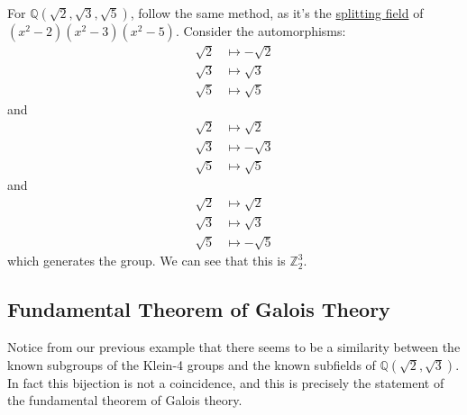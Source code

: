   \begin{example}
    \label{ex:computing-galois-groups-of-3-adjoining-elements}
    For $\mathbb{Q}(\sqrt{2}, \sqrt{3}, \sqrt{5})$, follow the same method, as it's the \hyperref[def:splitting-field]{splitting field} of $(x^2 - 2)(x^2 - 3)(x^2 - 5)$. Consider the automorphisms:
    \begin{align}
      \sqrt{2} &\mapsto -\sqrt{2} \\
      \sqrt{3} &\mapsto \sqrt{3} \\
      \sqrt{5} &\mapsto \sqrt{5}
    \end{align}
    and
    \begin{align}
      \sqrt{2} &\mapsto \sqrt{2} \\
      \sqrt{3} &\mapsto -\sqrt{3} \\
      \sqrt{5} &\mapsto \sqrt{5}
    \end{align}
    and
    \begin{align}
      \sqrt{2} &\mapsto \sqrt{2} \\
      \sqrt{3} &\mapsto \sqrt{3} \\
      \sqrt{5} &\mapsto -\sqrt{5}
    \end{align}
    which generates the group. We can see that this is $\mathbb{Z}_2^3$. 
  \end{example}

\subsection{Fundamental Theorem of Galois Theory}

  Notice from our previous example that there seems to be a similarity between the known subgroups of the Klein-4 groups and the known subfields of $\mathbb{Q}(\sqrt{2}, \sqrt{3})$. In fact this bijection is not a coincidence, and this is precisely the statement of the fundamental theorem of Galois theory. 

